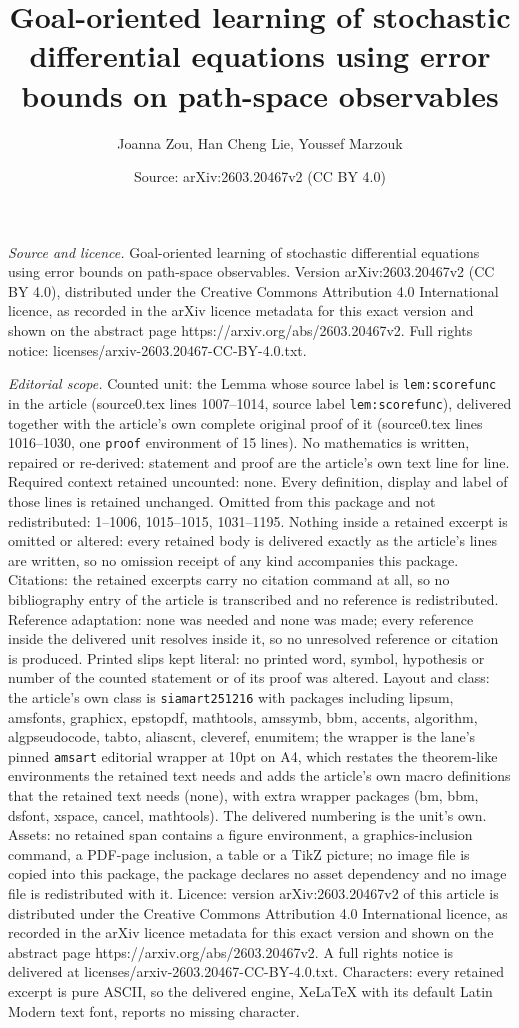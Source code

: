 \documentclass[10pt,a4paper]{amsart}
\title[Goal-oriented learning of stochastic differential equations ]{Goal-oriented learning of stochastic differential equations using error bounds on path-space observables}
\author{Joanna Zou, Han Cheng Lie, Youssef Marzouk}
\date{Source: arXiv:2603.20467v2 (CC BY 4.0)}
\begin{document}
\maketitle

\noindent\emph{Source and licence.} Goal-oriented learning of stochastic differential equations using error bounds on path-space observables. Version arXiv:2603.20467v2 (CC BY 4.0), distributed under the Creative Commons Attribution 4.0 International licence, as recorded in the arXiv licence metadata for this exact version and shown on the abstract page https://arxiv.org/abs/2603.20467v2. Full rights notice: licenses/arxiv-2603.20467-CC-BY-4.0.txt.\par\smallskip

\noindent\textit{Editorial scope.} Counted unit: the Lemma whose source label is \texttt{lem:scorefunc} in the article (source0.tex lines 1007--1014, source label \texttt{lem:scorefunc}), delivered together with the article's own complete original proof of it (source0.tex lines 1016--1030, one \texttt{proof} environment of 15 lines). No mathematics is written, repaired or re-derived: statement and proof are the article's own text line for line. Required context retained uncounted: none. Every definition, display and label of those lines is retained unchanged. Omitted from this package and not redistributed: 1--1006, 1015--1015, 1031--1195. Nothing inside a retained excerpt is omitted or altered: every retained body is delivered exactly as the article's lines are written, so no omission receipt of any kind accompanies this package. Citations: the retained excerpts carry no citation command at all, so no bibliography entry of the article is transcribed and no reference is redistributed. Reference adaptation: none was needed and none was made; every reference inside the delivered unit resolves inside it, so no unresolved reference or citation is produced. Printed slips kept literal: no printed word, symbol, hypothesis or number of the counted statement or of its proof was altered. Layout and class: the article's own class is \texttt{siamart251216} with packages including lipsum, amsfonts, graphicx, epstopdf, mathtools, amssymb, bbm, accents, algorithm, algpseudocode, tabto, aliascnt, cleveref, enumitem; the wrapper is the lane's pinned \texttt{amsart} editorial wrapper at 10pt on A4, which restates the theorem-like environments the retained text needs and adds the article's own macro definitions that the retained text needs (none), with extra wrapper packages (bm, bbm, dsfont, xspace, cancel, mathtools). The delivered numbering is the unit's own. Assets: no retained span contains a figure environment, a graphics-inclusion command, a PDF-page inclusion, a table or a TikZ picture; no image file is copied into this package, the package declares no asset dependency and no image file is redistributed with it. Licence: version arXiv:2603.20467v2 of this article is distributed under the Creative Commons Attribution 4.0 International licence, as recorded in the arXiv licence metadata for this exact version and shown on the abstract page https://arxiv.org/abs/2603.20467v2. A full rights notice is delivered at licenses/arxiv-2603.20467-CC-BY-4.0.txt. Characters: every retained excerpt is pure ASCII, so the delivered engine, XeLaTeX with its default Latin Modern text font, reports no missing character.
\end{document}
